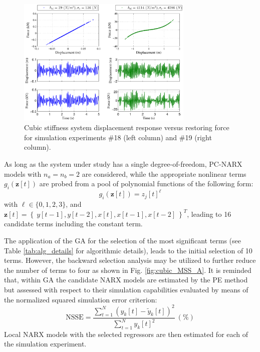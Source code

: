 \documentclass[preprint,3p,review,times,11pt]{elsarticle}
\newcommand{\beq}{\begin{equation}}
\newcommand{\eeq}{\end{equation}}
\newcommand{\bld}[1]{\boldsymbol{#1}}
\begin{document}
\begin{figure}[t!]
\begin{center}
\includegraphics[width = 0.75\textwidth]{figs/cubic_randexci.pdf}
\caption{Cubic stiffness system displacement response versus restoring force for simulation experiments $\#$18 (left column) and $\#$19 (right column).\label{fig:cubic_randexc}}
\end{center}
\end{figure}

As long as the system under study has a single degree-of-freedom, PC-NARX models with $ n_a = n_b = 2 $ are considered, while the appropriate nonlinear terms $g_i({\bld z}[t])$ are probed from a pool of polynomial functions of the following form:
%
$$ g_i({\bld z}[t]) = z_{j}[t]^{\ell} $$
%
with $\ell \in \{0,1,2,3\}$, and ${\bld z}[t] = \left\{ \ y[t-1], y[t-2], x[t], x[t-1], x[t-2]\ \right\}^{T}$, leading to 16 candidate terms including the constant term.

The application of the GA for the selection of the most significant terms (see Table \ref{tab:alg_details} for algorithmic details), leads to the initial selection of 10 terms. However, the backward selection analysis may be utilized to further reduce the number of terms to four as shown in Fig. \ref{fig:cubic_MSS_A}. It is reminded that, within GA the candidate NARX models are estimated by the PE method but assessed with respect to their simulation capabilities evaluated by means of the normalized squared simulation error criterion:
%
\beq
\text{NSSE} =\frac{ \sum_{t=1}^N \left(y_k[t] - \tilde{y}_k[t]\right)^2 } {\sum_{t=1}^N y_k[t]^2}\ (\%) 
\eeq
%
Local NARX models with the selected regressors are then estimated for each of the simulation experiment.
\end{document}
